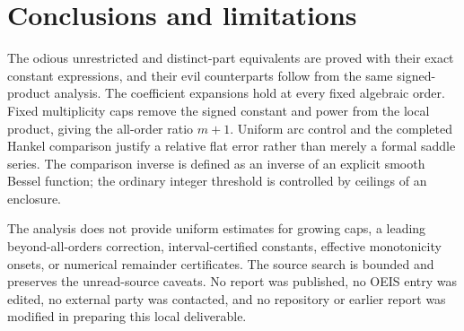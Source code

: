 \documentclass[11pt,letterpaper]{article}
\theoremstyle{remark}\newtheorem{remark}[theorem]{Remark}
\begin{document}
\section{Conclusions and limitations}
The odious unrestricted and distinct-part equivalents are proved with their exact constant expressions, and their evil counterparts follow from the same signed-product analysis. The coefficient expansions hold at every fixed algebraic order. Fixed multiplicity caps remove the signed constant and power from the local product, giving the all-order ratio $m+1$. Uniform arc control and the completed Hankel comparison justify a relative flat error rather than merely a formal saddle series. The comparison inverse is defined as an inverse of an explicit smooth Bessel function; the ordinary integer threshold is controlled by ceilings of an enclosure.

The analysis does not provide uniform estimates for growing caps, a leading beyond-all-orders correction, interval-certified constants, effective monotonicity onsets, or numerical remainder certificates. The source search is bounded and preserves the unread-source caveats. No report was published, no OEIS entry was edited, no external party was contacted, and no repository or earlier report was modified in preparing this local deliverable.
\end{document}

